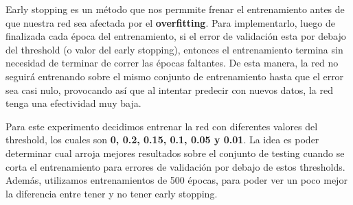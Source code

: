 Early stopping es un método que nos permmite frenar el entrenamiento antes de que nuestra red sea afectada por el \textbf{overfitting}. Para implementarlo, 
luego de finalizada cada época del entrenamiento, si el error de validación esta por debajo del threshold (o valor del early stopping), entonces el 
entrenamiento termina sin necesidad de terminar de correr las épocas faltantes. De esta manera, la red no seguirá entrenando sobre el mismo conjunto de 
entrenamiento hasta que el error sea casi nulo, provocando así que al intentar predecir con nuevos datos, la red tenga una efectividad muy baja.

Para este experimento decidimos entrenar la red con diferentes valores del threshold, los cuales son \textbf{0, 0.2, 0.15, 0.1, 0.05 y 0.01}. La 
idea es poder determinar cual arroja mejores resultados sobre el conjunto de testing cuando se corta el entrenamiento para errores de validación por 
debajo de estos thresholds. Además, utilizamos entrenamientos de 500 épocas, para poder ver un poco mejor la diferencia entre tener y no tener 
early stopping.

